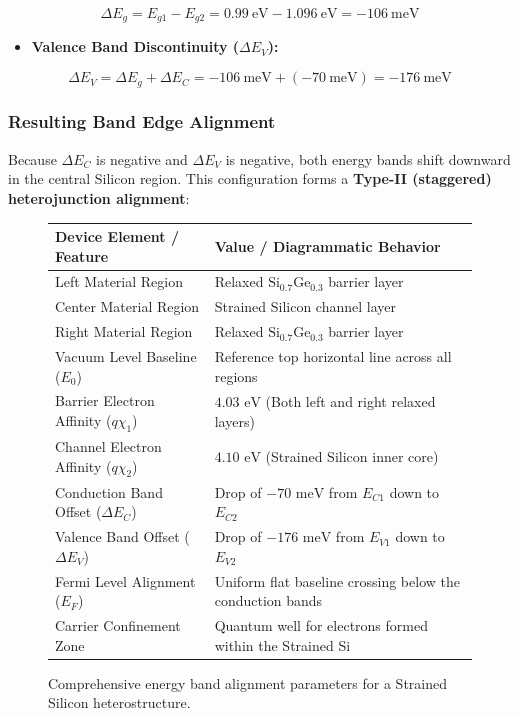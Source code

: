 \documentclass[
]{article}
\providecommand{\tightlist}{%
  \setlength{\itemsep}{0pt}\setlength{\parskip}{0pt}}
\begin{document}
\[\Delta E_g = E_{g1} - E_{g2} = 0.99\ \text{eV} - 1.096\ \text{eV} = -106\ \text{meV}\]

\begin{itemize}
\tightlist
\item
  \textbf{Valence Band Discontinuity (\(\Delta E_V\)):}
\end{itemize}

\[\Delta E_V = \Delta E_g + \Delta E_C = -106\ \text{meV} + (-70\ \text{meV}) = -176\ \text{meV}\]

\subsubsection{Resulting Band Edge
Alignment}\label{resulting-band-edge-alignment}

Because \(\Delta E_C\) is negative and \(\Delta E_V\) is negative, both
energy bands shift downward in the central Silicon region. This
configuration forms a \textbf{Type-II (staggered) heterojunction
alignment}:

\begin{figure}[h!]
\centering
\renewcommand{\arraystretch}{1.4}
\begin{tabular}{|l|l|}
\hline
\textbf{Device Element / Feature} & \textbf{Value / Diagrammatic Behavior} \\ \hline
Left Material Region & Relaxed $\text{Si}_{0.7}\text{Ge}_{0.3}$ barrier layer \\ \hline
Center Material Region & Strained Silicon channel layer \\ \hline
Right Material Region & Relaxed $\text{Si}_{0.7}\text{Ge}_{0.3}$ barrier layer \\ \hline
Vacuum Level Baseline ($E_0$) & Reference top horizontal line across all regions \\ \hline
Barrier Electron Affinity ($q\chi_1$) & $4.03\text{ eV}$ (Both left and right relaxed layers) \\ \hline
Channel Electron Affinity ($q\chi_2$) & $4.10\text{ eV}$ (Strained Silicon inner core) \\ \hline
Conduction Band Offset ($\Delta E_C$) & Drop of $-70\text{ meV}$ from $E_{C1}$ down to $E_{C2}$ \\ \hline
Valence Band Offset ($\Delta E_V$) & Drop of $-176\text{ meV}$ from $E_{V1}$ down to $E_{V2}$ \\ \hline
Fermi Level Alignment ($E_F$) & Uniform flat baseline crossing below the conduction bands \\ \hline
Carrier Confinement Zone & Quantum well for electrons formed within the Strained Si \\ \hline
\end{tabular}
\caption{Comprehensive energy band alignment parameters for a Strained Silicon heterostructure.}
\end{figure}
\end{document}
